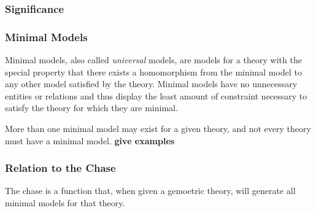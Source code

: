 		\subsubsection{Significance}

			

		\subsubsection{Minimal Models}

			Minimal models, also called \emph{universal} models, are models for a
			theory with the special property that there exists a homomorphism from
			the minimal model to any other model satisfied by the theory. Minimal
			models have no unnecessary entities or relations and thus display the
			least amount of constraint necessary to satisfy the theory for which
			they are minimal.

			More than one minimal model may exist for a given theory, and not every
			theory must have a minimal model. \textbf{give examples}

		\subsubsection{Relation to the Chase}

			The chase is a function that, when given a gemoetric theory, will
			generate all minimal models for that theory.
